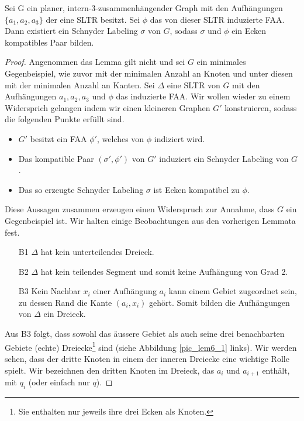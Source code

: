 

\begin{lemma}\label{lem6}
Sei G ein planer, intern-3-zusammenhängender Graph mit den Aufhängungen $\{a_1,a_2,a_3\}$ der eine SLTR besitzt. Sei $\phi$ das von dieser SLTR induzierte FAA. Dann existiert ein Schnyder Labeling $\sigma$ von $G$, sodass $\sigma$ und $\phi$ ein Ecken kompatibles Paar bilden.
\end{lemma}

\begin{proof}
Angenommen das Lemma gilt nicht und sei $G$ ein minimales Gegenbeispiel, wie zuvor mit der minimalen Anzahl an Knoten und unter diesen mit der minimalen Anzahl an Kanten. Sei $\Delta$ eine SLTR von $G$ mit den Aufhängungen $a_1,a_2,a_3$ und $\phi$ das induzierte FAA. Wir wollen wieder zu einem Widersprich gelangen indem wir einen kleineren Graphen $G'$ konstruieren, sodass die folgenden Punkte erfüllt sind.
\begin{itemize}
\item $G'$ besitzt ein FAA $\phi'$, welches von $\phi$ indiziert wird.
\item Das kompatible Paar $(\sigma',\phi')$ von $G'$ induziert ein Schnyder Labeling von $G$.
\item Das so erzeugte Schnyder Labeling $\sigma$ ist Ecken kompatibel zu $\phi$.
\end{itemize}
Diese Aussagen zusammen erzeugen einen Widerspruch zur Annahme, dass $G$ ein Gegenbeispiel ist. Wir halten einige Beobachtungen aus den vorherigen Lemmata fest.
\begin{itemize}
\item [B1] $\Delta$ hat kein unterteilendes Dreieck.
\item [B2] $\Delta$ hat kein teilendes Segment und somit keine Aufhängung von Grad 2.
\item [B3] Kein Nachbar $x_i$ einer Aufhängung $a_i$ kann einem Gebiet zugeordnet sein, zu dessen Rand die Kante $(a_i,x_i)$ gehört. Somit bilden die Aufhängungen von $\Delta$ ein Dreieck.
\end{itemize}

Aus B3 folgt, dass sowohl das äussere Gebiet als auch seine drei benachbarten Gebiete (echte) Dreiecke\footnote{Sie enthalten nur jeweils ihre drei Ecken als Knoten.} sind (siehe Abbildung \ref{pic_lem6_1} links). Wir werden sehen, dass der dritte Knoten in einem der inneren Dreiecke eine wichtige Rolle spielt. Wir bezeichnen den dritten Knoten im Dreieck, das $a_i$ und $a_{i+1}$ enthält, mit $q_i$ (oder einfach nur $q$).


\end{proof}

